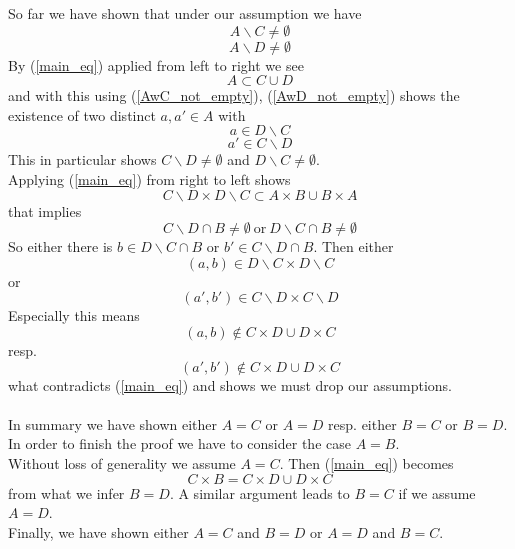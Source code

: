 \documentclass[17pt]{extarticle}
\begin{document}
So far we have shown that under our assumption we have 
\begin{equation} \label{AwC_not_empty}
A\backslash C\neq\emptyset
\end{equation}
\begin{equation} \label{AwD_not_empty}
A\backslash D\neq\emptyset
\end{equation}
By (\ref{main_eq}) applied from left to right we see
$$A\subset C\cup D$$
and with this using (\ref{AwC_not_empty}), (\ref{AwD_not_empty})
shows the existence of two distinct $a, a'\in A$ with
\begin{equation} \label{a_not_in_C}
	a\in D\backslash C
\end{equation}
\begin{equation} \label{a'_not_in_D}
	a'\in C\backslash D
\end{equation}
This in particular shows $C\backslash D\neq\emptyset$ and $D\backslash C\neq\emptyset$.\\
Applying (\ref{main_eq}) from right to left shows
$$C\backslash D\times D\backslash C\subset A\times B\cup B\times A$$
that implies 
$$C\backslash D\cap B\neq\emptyset \ \text{or} \ D\backslash C\cap B\neq\emptyset$$
So either there is $b\in D\backslash C\cap B$ or $b'\in C\backslash D\cap B$.
Then either
$$(a, b)\in  D\backslash C\times  D\backslash C$$
or
$$(a', b')\in C\backslash D\times C\backslash D$$
Especially this means
$$(a,b) \notin C\times D\cup D\times C$$
resp.
$$(a', b')\notin C\times D\cup D\times C$$
what contradicts (\ref{main_eq}) and shows we must drop our assumptions.\\ \\
In summary we have shown either $A=C$ or $A=D$ resp. either $B=C$ or $B=D$.
In order to finish the proof we have to consider the case $A=B$.\\
Without loss of generality we assume $A=C$. Then (\ref{main_eq}) becomes
$$C\times B=C\times D\cup D\times C$$
from what we infer $B=D$. A similar argument leads to $B=C$ if we assume $A=D$.\\
Finally, we have shown either $A=C$ and $B=D$ or $A=D$ and $B=C$.
\end{document}
